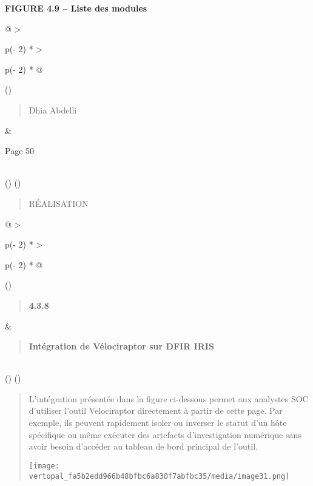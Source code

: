 \documentclass[
]{article}
\begin{document}
\textbf{FIGURE 4.9 -- Liste des modules}

\begin{longtable}[]{@{}
  >{\raggedright\arraybackslash}p{(\columnwidth - 2\tabcolsep) * }
  >{\raggedright\arraybackslash}p{(\columnwidth - 2\tabcolsep) * }@{}}
\toprule()
\begin{minipage}[b]{\linewidth}\raggedright
\begin{quote}
Dhia Abdelli
\end{quote}
\end{minipage} & \begin{minipage}[b]{\linewidth}\raggedright
Page 50
\end{minipage} \\
\midrule()
\endhead
\bottomrule()
\end{longtable}

\begin{quote}
RÉALISATION
\end{quote}

\begin{longtable}[]{@{}
  >{\raggedright\arraybackslash}p{(\columnwidth - 2\tabcolsep) * }
  >{\raggedright\arraybackslash}p{(\columnwidth - 2\tabcolsep) * }@{}}
\toprule()
\begin{minipage}[b]{\linewidth}\raggedright
\begin{quote}
\textbf{4.3.8}
\end{quote}
\end{minipage} & \begin{minipage}[b]{\linewidth}\raggedright
\begin{quote}
\textbf{Intégration de Vélociraptor sur DFIR IRIS}
\end{quote}
\end{minipage} \\
\midrule()
\endhead
\bottomrule()
\end{longtable}

\begin{quote}
L'intégration présentée dans la figure ci-dessous permet aux analystes
SOC d'utiliser l'outil Velociraptor directement à partir de cette page.
Par exemple, ils peuvent rapidement isoler ou inverser le statut d'un
hôte spécifique ou même exécuter des artefacts d'investigation numérique
sans avoir besoin d'accéder au tableau de bord principal de l'outil.

\texttt{[image: vertopal\_fa5b2edd966b48bfbc6a830f7abfbc35/media/image31.png]}
\end{quote}
\end{document}
